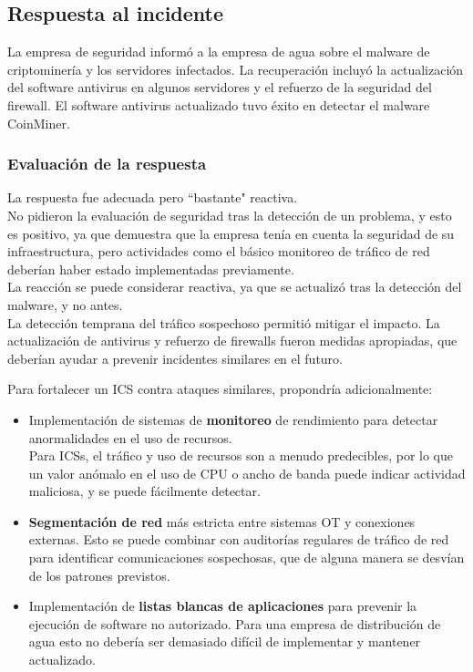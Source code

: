 \subsection{Respuesta al incidente}
La empresa de seguridad informó a la empresa de agua sobre el malware de criptominería y los servidores infectados. La recuperación incluyó la actualización del software antivirus en algunos servidores y el refuerzo de la seguridad del firewall. El software antivirus actualizado tuvo éxito en detectar el malware CoinMiner.

\subsubsection{Evaluación de la respuesta}
La respuesta fue adecuada pero ``bastante" reactiva.\\
No pidieron la evaluación de seguridad tras la detección de un problema, y esto es positivo, ya que demuestra que la empresa tenía en cuenta la seguridad de su infraestructura, pero actividades como el básico monitoreo de tráfico de red deberían haber estado implementadas previamente.\\
La reacción se puede considerar reactiva, ya que se actualizó tras la detección del malware, y no antes.\\
La detección temprana del tráfico sospechoso permitió mitigar el impacto.
La actualización de antivirus y refuerzo de firewalls fueron medidas apropiadas, que deberían ayudar a prevenir incidentes similares en el futuro.

Para fortalecer un ICS contra ataques similares, propondría adicionalmente:
\begin{itemize}
    \item Implementación de sistemas de \textbf{monitoreo} de rendimiento para detectar anormalidades en el uso de recursos.\\
        Para ICSs, el tráfico y uso de recursos son a menudo predecibles, por lo que un valor anómalo en el uso de CPU o ancho de banda puede indicar actividad maliciosa, y se puede fácilmente detectar.
        \item \textbf{Segmentación de red} más estricta entre sistemas \textsc{OT} y conexiones externas.
        Esto se puede combinar con auditorías regulares de tráfico de red para identificar comunicaciones sospechosas, que de alguna manera se desvían de los patrones previstos.
        \item Implementación de \textbf{listas blancas de aplicaciones} para prevenir la ejecución de software no autorizado.
        Para una empresa de distribución de agua esto no debería ser demasiado difícil de implementar y mantener actualizado.
\end{itemize}

